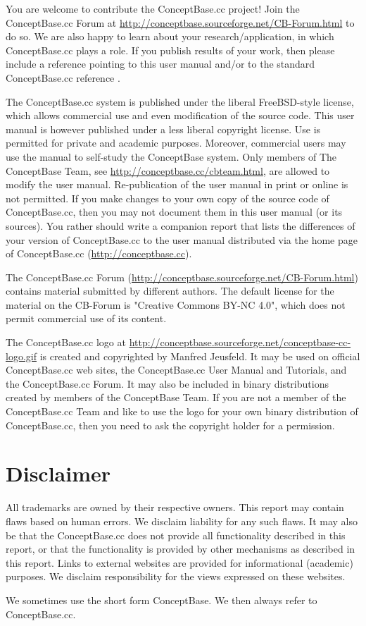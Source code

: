 You are welcome to contribute the ConceptBase.cc project! Join the 
ConceptBase.cc Forum at
\url{http://conceptbase.sourceforge.net/CB-Forum.html} to do so.
We are also happy to learn about your research/application, in which ConceptBase.cc plays a role.
If you publish results of your work, then please include a reference pointing to this
user manual and/or to the standard ConceptBase.cc reference \cite{JIIS}. 

The ConceptBase.cc system is published under the liberal FreeBSD-style license, which allows
commercial use and even modification of the source code. This user manual is
however published under a less liberal copyright license. Use is permitted for
private and academic purposes. Moreover, commercial users may use the manual to
self-study the ConceptBase system. Only members of The ConceptBase Team,
see \url{http://conceptbase.cc/cbteam.html}, are allowed to modify the user manual.
Re-publication of the user manual in print or online is not permitted.
If you make changes to your own copy of the source code of ConceptBase.cc,
then you may not document them in this user manual (or its sources).
You rather should write a companion report that lists the differences of
your version of ConceptBase.cc to the user manual distributed via the home page of
ConceptBase.cc (\url{http://conceptbase.cc}). 

The ConceptBase.cc Forum (\url{http://conceptbase.sourceforge.net/CB-Forum.html})
contains material submitted by different authors. The default license for
the material on the CB-Forum is "Creative Commons BY-NC 4.0", which does not permit
commercial use of its content. 

The ConceptBase.cc logo at \url{http://conceptbase.sourceforge.net/conceptbase-cc-logo.gif}
is created and copyrighted by Manfred Jeusfeld. It may be used on official
ConceptBase.cc web sites, the ConceptBase.cc User Manual and Tutorials, and the ConceptBase.cc Forum.
It may also be included in binary distributions created by members of the ConceptBase Team.
If you are not a member of the ConceptBase.cc Team and like to use the logo for your own binary
distribution of ConceptBase.cc, then you need to ask the copyright holder for a permission.


\section{Disclaimer}
\label{sec:disclaimer}

All trademarks are owned by their respective owners. This report may contain flaws based on
human errors. We disclaim liability for any such flaws. It may also be that the ConceptBase.cc
does not provide all functionality described in this report, or that the functionality is provided
by other mechanisms as described in this report. Links to external websites are provided for
informational (academic) purposes. We disclaim responsibility for the views expressed on these websites.

We sometimes use the short form ConceptBase. We then always refer to ConceptBase.cc. 










